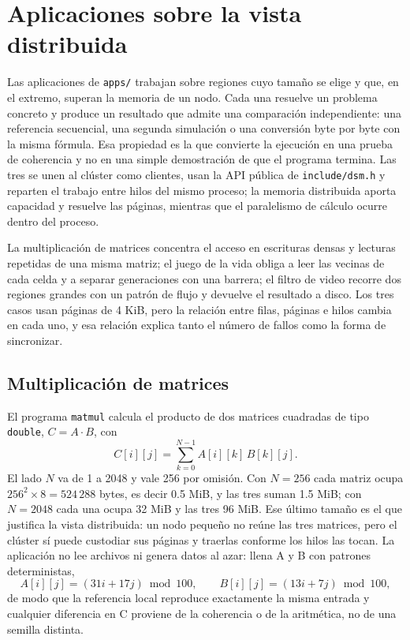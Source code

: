 \section{Aplicaciones sobre la vista distribuida}\label{sec:aplicaciones}

Las aplicaciones de \texttt{apps/} trabajan sobre regiones cuyo tamaño se elige y que, en el extremo, superan la memoria de un nodo. Cada una resuelve un problema concreto y produce un resultado que admite una comparación independiente: una referencia secuencial, una segunda simulación o una conversión byte por byte con la misma fórmula. Esa propiedad es la que convierte la ejecución en una prueba de coherencia y no en una simple demostración de que el programa termina. Las tres se unen al clúster como clientes, usan la API pública de \texttt{include/dsm.h} y reparten el trabajo entre hilos del mismo proceso; la memoria distribuida aporta capacidad y resuelve las páginas, mientras que el paralelismo de cálculo ocurre dentro del proceso.

La multiplicación de matrices concentra el acceso en escrituras densas y lecturas repetidas de una misma matriz; el juego de la vida obliga a leer las vecinas de cada celda y a separar generaciones con una barrera; el filtro de video recorre dos regiones grandes con un patrón de flujo y devuelve el resultado a disco. Los tres casos usan páginas de 4 KiB, pero la relación entre filas, páginas e hilos cambia en cada uno, y esa relación explica tanto el número de fallos como la forma de sincronizar.

\subsection{Multiplicación de matrices}\label{sec:matmul}

El programa \texttt{matmul} calcula el producto de dos matrices cuadradas de tipo \texttt{double}, $C = A \cdot B$, con
\begin{equation}
C[i][j] = \sum_{k=0}^{N-1} A[i][k]\,B[k][j].
\end{equation}
El lado $N$ va de 1 a 2048 y vale 256 por omisión. Con $N=256$ cada matriz ocupa $256^2 \times 8 = 524\,288$ bytes, es decir 0.5 MiB, y las tres suman 1.5 MiB; con $N=2048$ cada una ocupa 32 MiB y las tres 96 MiB. Ese último tamaño es el que justifica la vista distribuida: un nodo pequeño no reúne las tres matrices, pero el clúster sí puede custodiar sus páginas y traerlas conforme los hilos las tocan. La aplicación no lee archivos ni genera datos al azar: llena A y B con patrones deterministas,
\begin{equation}
A[i][j] = (31i + 17j) \bmod 100, \qquad B[i][j] = (13i + 7j) \bmod 100,
\end{equation}
de modo que la referencia local reproduce exactamente la misma entrada y cualquier diferencia en C proviene de la coherencia o de la aritmética, no de una semilla distinta.

